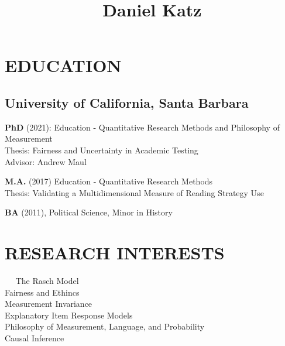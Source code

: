\documentclass[11pt, oneside]{memoir}
\title{Daniel Katz}
\author{}
\date{}
\begin{document}
\vspace{7mm}

\hypertarget{education}{%
\section{EDUCATION}\label{education}}

\hypertarget{university-of-california-santa-barbara}{%
\subsection{University of California, Santa
Barbara}\label{university-of-california-santa-barbara}}

\textbf{PhD} (2021): Education - Quantitative Research Methods and
Philosophy of Measurement\\
\hspace*{0.333em}\hspace*{0.333em}Thesis: Fairness and Uncertainty in
Academic Testing\\
\hspace*{0.333em}\hspace*{0.333em}Advisor: Andrew Maul

\textbf{M.A.} (2017) Education - Quantitative Research Methods\\
\hspace*{0.333em}\hspace*{0.333em} Thesis: Validating a Multidimensional
Measure of Reading Strategy Use

\textbf{BA} (2011), Political Science, Minor in History \vspace{7mm}

\hypertarget{research-interests}{%
\section{RESEARCH INTERESTS}\label{research-interests}}

~~ The Rasch Model\\
\hspace*{0.333em}\hspace*{0.333em} Fairness and Ethincs\\
\hspace*{0.333em}\hspace*{0.333em} Measurement Invariance\\
\hspace*{0.333em}\hspace*{0.333em} Explanatory Item Response Models\\
\hspace*{0.333em}\hspace*{0.333em} Philosophy of Measurement, Language,
and Probability\\
\hspace*{0.333em}\hspace*{0.333em} Causal Inference\\
\vspace{7mm}
\end{document}
